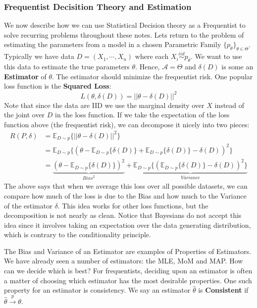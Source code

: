 \documentclass[]{article}
\theoremstyle{mattstyle}
\theoremstyle{definition}
\begin{document}
\subsubsection{Frequentist Decisition Theory and Estimation}\label{sec:freqbiasvar}
We now describe how we can use Statistical Decision theory as a Frequentist to solve recurring problems throughout these notes. Lets return to the problem of estimating the parameters from a model in a chosen Parametric Family $\{p_{\theta}\}_{\theta\in\Theta}$. Typically we have data \(D=(X_1, \cdots, X_n)\) where each \(X_i\overset{iid}{\sim} p_{\theta}\). We want to use this data to estimate the true parameters \(\theta\). Hence, \(\mathcal{A} = \Theta\) and $\delta(D)$ is some an \textbf{Estimator} of \(\theta\). The estimator should minimize the frequentist risk. One popular loss function is the \textbf{Squared Loss}: 
$$L(\theta,\delta(D)) = ||\theta-\delta(D)||^2$$
Note that since the data are IID we use the marginal density over $X$ instead of the joint over $D$ in the loss function. If we take the expectation of the loss function above (the frequentist risk), we can decompose it nicely into two pieces:
\begin{align*}
R(P,\delta)&=\mathbb{E}_{D\sim p}\{||\theta-\delta(D)||^2\}\\
&=\mathbb{E}_{D\sim p}\{(\theta-\mathbb{E}_{D\sim p}\{\delta(D)\} + \mathbb{E}_{D\sim p}\{\delta(D)\} - \delta(D))^2\}\\
&=\underbrace{(\theta-\mathbb{E}_{D\sim p}\{\delta(D)\})^2}_{Bias^2} + \underbrace{\mathbb{E}_{D\sim p}\{(\mathbb{E}_{D\sim p}\{\delta(D)\} - \delta(D))^2\}}_{Variance}
\end{align*}
The above says that when we average this loss over all possible datasets, we can compare how much of the loss is due to the Bias and how much to the Variance of the estimator $\delta$. This idea works for other loss functions, but the decomposition is not nearly as clean. Notice that Bayesians do not accept this idea since it involves taking an expectation over the data generating distribution, which is contrary to the conditionality principle.

The Bias and Variance of an Estimator are examples of Properties of Estimators. We have already seen a number of estimators: the MLE, MoM and MAP. How can we decide which is best? For frequentists, deciding upon an estimator is often a matter of choosing which estimator has the most desirable properties. One such property for an estimator is consistency. We say an estimator $\hat{\theta}$ is \textbf{Consistent} if $\hat{\theta} \overset{p}{\rightarrow} \theta$.
\end{document}

